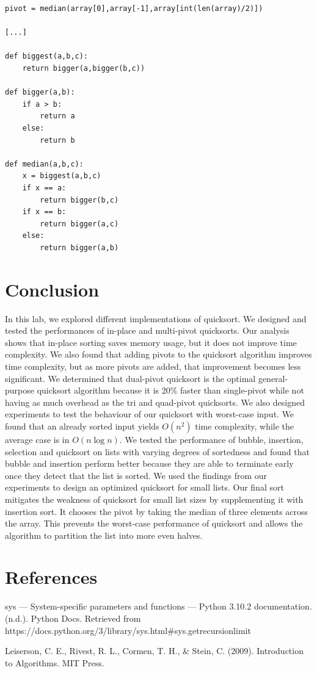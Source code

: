 \documentclass[12pt]{article}
\begin{document}
\footnotesize
\begin{verbatim}
pivot = median(array[0],array[-1],array[int(len(array)/2)])

[...]

def biggest(a,b,c):
    return bigger(a,bigger(b,c))

def bigger(a,b):
    if a > b:
        return a
    else:
        return b

def median(a,b,c):
    x = biggest(a,b,c)
    if x == a:
        return bigger(b,c)
    if x == b:
        return bigger(a,c)
    else:
        return bigger(a,b)
\end{verbatim}
\normalsize


\section{Conclusion}
 In this lab, we explored different implementations of quicksort. We designed and tested the performances of in-place and multi-pivot quicksorts. Our analysis shows that in-place sorting saves memory usage, but it does not improve time complexity. We also found that adding pivots to the quicksort algorithm improves time complexity, but as more pivots are added, that improvement becomes less significant. We determined that dual-pivot quicksort is the optimal general-purpose quicksort algorithm because it is 20\% faster than single-pivot while not having as much overhead as the tri and quad-pivot quicksorts. We also designed experiments to test the behaviour of our quicksort with worst-case input. We found that an already sorted input yields $O(n^2)$ time complexity, while the average case is in $O(n\log{n})$. We tested the performance of bubble, insertion, selection and quicksort on lists with varying degrees of sortedness and found that bubble and insertion perform better because they are able to terminate early once they detect that the list is sorted. We used the findings from our experiments to design an optimized quicksort for small lists. Our final sort mitigates the weakness of quicksort for small list sizes by supplementing it with insertion sort. It chooses the pivot by taking the median of three elements across the array. This prevents the worst-case performance of quicksort and allows the algorithm to partition the list into more even halves.

\newpage\section*{References}
\begin{enumerate}[label={[\arabic*]}]
\item	sys — System-specific parameters and functions — Python 3.10.2 documentation. (n.d.). Python Docs. Retrieved from https://docs.python.org/3/library/sys.html\#sys.getrecursionlimit
\item	Leiserson, C. E., Rivest, R. L., Cormen, T. H., \& Stein, C. (2009). Introduction to Algorithms. MIT Press.

\end{enumerate}
\end{document}
